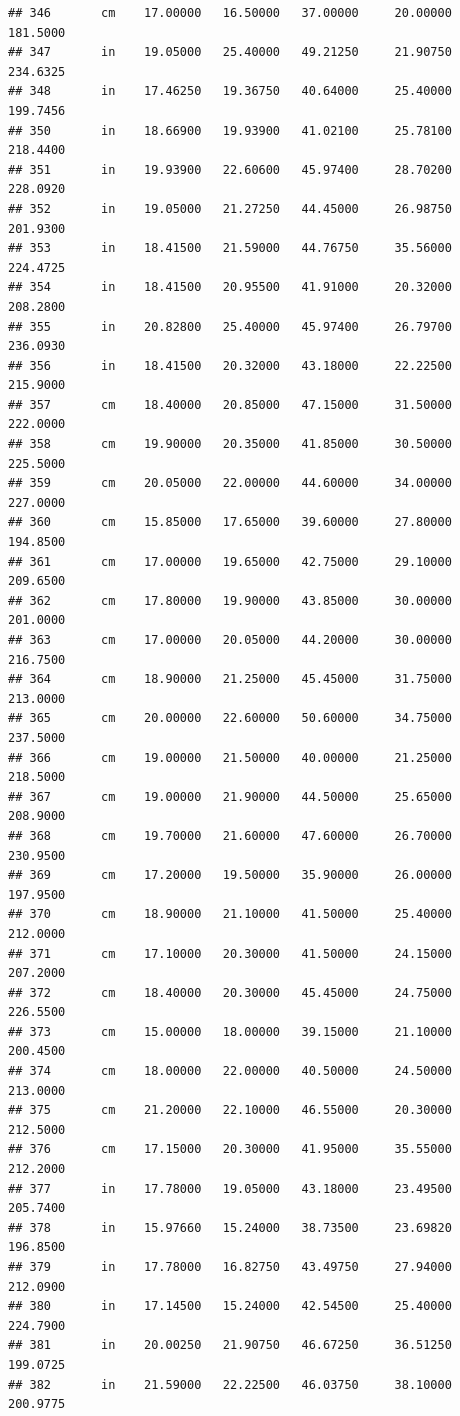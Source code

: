 \documentclass[]{article}
\begin{document}
\begin{verbatim}
## 346       cm    17.00000   16.50000   37.00000     20.00000  181.5000
## 347       in    19.05000   25.40000   49.21250     21.90750  234.6325
## 348       in    17.46250   19.36750   40.64000     25.40000  199.7456
## 350       in    18.66900   19.93900   41.02100     25.78100  218.4400
## 351       in    19.93900   22.60600   45.97400     28.70200  228.0920
## 352       in    19.05000   21.27250   44.45000     26.98750  201.9300
## 353       in    18.41500   21.59000   44.76750     35.56000  224.4725
## 354       in    18.41500   20.95500   41.91000     20.32000  208.2800
## 355       in    20.82800   25.40000   45.97400     26.79700  236.0930
## 356       in    18.41500   20.32000   43.18000     22.22500  215.9000
## 357       cm    18.40000   20.85000   47.15000     31.50000  222.0000
## 358       cm    19.90000   20.35000   41.85000     30.50000  225.5000
## 359       cm    20.05000   22.00000   44.60000     34.00000  227.0000
## 360       cm    15.85000   17.65000   39.60000     27.80000  194.8500
## 361       cm    17.00000   19.65000   42.75000     29.10000  209.6500
## 362       cm    17.80000   19.90000   43.85000     30.00000  201.0000
## 363       cm    17.00000   20.05000   44.20000     30.00000  216.7500
## 364       cm    18.90000   21.25000   45.45000     31.75000  213.0000
## 365       cm    20.00000   22.60000   50.60000     34.75000  237.5000
## 366       cm    19.00000   21.50000   40.00000     21.25000  218.5000
## 367       cm    19.00000   21.90000   44.50000     25.65000  208.9000
## 368       cm    19.70000   21.60000   47.60000     26.70000  230.9500
## 369       cm    17.20000   19.50000   35.90000     26.00000  197.9500
## 370       cm    18.90000   21.10000   41.50000     25.40000  212.0000
## 371       cm    17.10000   20.30000   41.50000     24.15000  207.2000
## 372       cm    18.40000   20.30000   45.45000     24.75000  226.5500
## 373       cm    15.00000   18.00000   39.15000     21.10000  200.4500
## 374       cm    18.00000   22.00000   40.50000     24.50000  213.0000
## 375       cm    21.20000   22.10000   46.55000     20.30000  212.5000
## 376       cm    17.15000   20.30000   41.95000     35.55000  212.2000
## 377       in    17.78000   19.05000   43.18000     23.49500  205.7400
## 378       in    15.97660   15.24000   38.73500     23.69820  196.8500
## 379       in    17.78000   16.82750   43.49750     27.94000  212.0900
## 380       in    17.14500   15.24000   42.54500     25.40000  224.7900
## 381       in    20.00250   21.90750   46.67250     36.51250  199.0725
## 382       in    21.59000   22.22500   46.03750     38.10000  200.9775

\end{verbatim}
\end{document}
